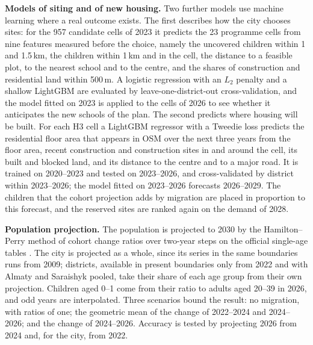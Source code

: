 \textbf{Models of siting and of new housing.}\label{sec:method-siting} Two further models use machine learning where a real outcome exists. The first describes how the city chooses sites: for the 957 candidate cells of 2023 it predicts the 23 programme cells from nine features measured before the choice, namely the uncovered children within 1 and 1.5\,km, the children within 1\,km and in the cell, the distance to a feasible plot, to the nearest school and to the centre, and the shares of construction and residential land within 500\,m. A logistic regression with an $L_2$ penalty and a shallow LightGBM are evaluated by leave-one-district-out cross-validation, and the model fitted on 2023 is applied to the cells of 2026 to see whether it anticipates the new schools of the plan. The second predicts where housing will be built. For each H3 cell a LightGBM regressor with a Tweedie loss predicts the residential floor area that appears in OSM over the next three years from the floor area, recent construction and construction sites in and around the cell, its built and blocked land, and its distance to the centre and to a major road. It is trained on 2020--2023 and tested on 2023--2026, and cross-validated by district within 2023--2026; the model fitted on 2023--2026 forecasts 2026--2029. The children that the cohort projection adds by migration are placed in proportion to this forecast, and the reserved sites are ranked again on the demand of 2028.

\textbf{Population projection.}\label{sec:method-projection} The population is projected to 2030 by the Hamilton--Perry method of cohort change ratios over two-year steps on the official single-age tables \cite{statages2026}. The city is projected as a whole, since its series in the same boundaries runs from 2009; districts, available in present boundaries only from 2022 and with Almaty and Saraishyk pooled, take their share of each age group from their own projection. Children aged 0--1 come from their ratio to adults aged 20--39 in 2026, and odd years are interpolated. Three scenarios bound the result: no migration, with ratios of one; the geometric mean of the change of 2022--2024 and 2024--2026; and the change of 2024--2026. Accuracy is tested by projecting 2026 from 2024 and, for the city, from 2022.

